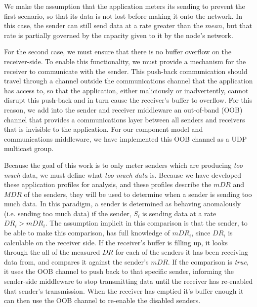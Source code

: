 We make the assumption that the application meters its sending to
prevent the first scenario, so that its data is not lost before making
it onto the network.  In this case, the sender can still send data at
a rate greater than the $mean$, but that rate is partially
governed by the capacity given to it by the node's network.

For the second case, we must ensure that there is no buffer overflow
on the receiver-side.  To enable this functionality, we must provide a
mechanism for the receiver to communicate with the sender.  This
push-back communication should travel through a channel outside the
communications channel that the application has access to, so that the
application, either maliciously or inadvertently, cannot disrupt this
push-back and in turn cause the receiver's buffer to overflow.  For
this reason, we add into the sender and receiver middleware an
out-of-band (OOB) channel that provides a communications layer between
all senders and receivers that is invisible to the application.  For
our component model and communications middleware, we have implemented
this OOB channel as a UDP multicast group.

Because the goal of this work is to only meter senders which are
producing \emph{too much} data, we must define what \emph{too much data} is.
Because we have developed these application profiles for analysis, and
these profiles describe the $mDR$ and $MDR$ of the
senders, they will be used to determine when a sender is sending too
much data.  In this paradigm, a sender is determined as behaving
anomalously (i.e. sending too much data) if the sender, $S_i$ is
sending data at a rate $DR_i > mDR_i$.  The assumption implicit
in this comparison is that the sender, to be able to make this
comparison, has full knowledge of $mDR_i$, since $DR_i$ is
calculable on the receiver side.  If the receiver's buffer is filling
up, it looks through the all of the measured $DR$ for each of
the senders it has been receiving data from, and compares it against
the sender's $mDR$.  If the comparison is \emph{true}, it uses the
OOB channel to push back to that specific sender, informing the
sender-side middleware to stop transmitting data until the receiver
has re-enabled that sender's transmission.  When the receiver has
emptied it's buffer enough it can then use the OOB channel to
re-enable the disabled senders.  

